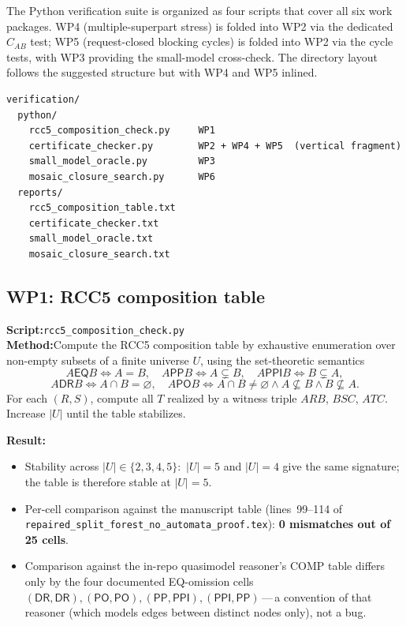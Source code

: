 \documentclass[11pt]{article}
\newcommand{\EQ}{\mathsf{EQ}}
\newcommand{\PP}{\mathsf{PP}}
\newcommand{\PPI}{\mathsf{PPI}}
\newcommand{\PO}{\mathsf{PO}}
\newcommand{\DR}{\mathsf{DR}}
\begin{document}
The Python verification suite is organized as four scripts that
cover all six work packages.  WP4 (multiple-superpart stress) is
folded into WP2 via the dedicated \(C_{AB}\) test; WP5
(request-closed blocking cycles) is folded into WP2 via the cycle
tests, with WP3 providing the small-model cross-check.  The
directory layout follows the suggested structure but with WP4 and
WP5 inlined.

\begin{lstlisting}
verification/
  python/
    rcc5_composition_check.py     WP1
    certificate_checker.py        WP2 + WP4 + WP5  (vertical fragment)
    small_model_oracle.py         WP3
    mosaic_closure_search.py      WP6
  reports/
    rcc5_composition_table.txt
    certificate_checker.txt
    small_model_oracle.txt
    mosaic_closure_search.txt
\end{lstlisting}

\subsection{WP1: RCC5 composition table}

\textbf{Script:}\quad \texttt{rcc5\_composition\_check.py}\\
\textbf{Method:}\quad Compute the RCC5 composition table by
exhaustive enumeration over non-empty subsets of a finite universe
\(U\), using the set-theoretic semantics
\[
A\EQ B \iff A=B,\quad
A\PP B \iff A\subsetneq B,\quad
A\PPI B \iff B\subsetneq A,
\]
\[
A\DR B \iff A\cap B=\varnothing,\quad
A\PO B \iff A\cap B\neq\varnothing\wedge A\nsubseteq B\wedge B\nsubseteq A.
\]
For each \((R,S)\), compute all \(T\) realized by a witness triple
\(A R B\), \(B S C\), \(A T C\).  Increase \(|U|\) until the table
stabilizes.

\textbf{Result:}
\begin{itemize}[leftmargin=2em]
  \item Stability across \(|U| \in \{2,3,4,5\}\):\ \(|U|=5\) and
    \(|U|=4\) give the same signature; the table is therefore
    stable at \(|U|=5\).
  \item Per-cell comparison against the manuscript table
    (lines~99--114 of \texttt{repaired\_split\_forest\_no\_auto\-mata\_proof.tex}):
    \textbf{0 mismatches out of 25 cells}.
  \item Comparison against the in-repo quasimodel reasoner's COMP
    table differs only by the four documented EQ-omission cells
    \((\DR,\DR),(\PO,\PO),(\PP,\PPI),(\PPI,\PP)\)\,---\,a
    convention of that reasoner (which models edges between
    distinct nodes only), not a bug.
\end{itemize}
\end{document}
